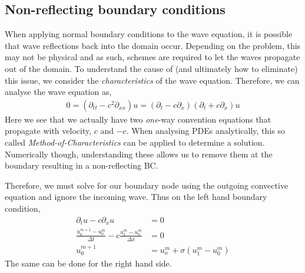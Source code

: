 \documentclass[11pt,a4paper]{report}
\theoremstyle{definition}
\begin{document}
\subsection{Non-reflecting boundary conditions}
When applying normal boundary conditions to the wave equation, it is possible that wave reflections back into the domain occur. Depending on the problem, this may not be physical and as such, schemes are required to let the waves propagate out of the domain. To understand the cause of (and ultimately how to eliminate) this issue, we consider the \textit{characteristics} of the wave equation. Therefore, we can analyse the wave equation as,
\begin{align*}
0 = \left(\partial_{tt} - c^2 \partial_{xx}\right) u = (\partial_t - c \partial_x)(\partial_t + c \partial_x)u
\end{align*}
Here we see that we actually have two \textit{one}-way convention equations that propagate with velocity, $c$ and $-c$. When analysing PDEs analytically, this so called \textit{Method-of-Characteristics} can be applied to determine a solution. Numerically though, understanding these allows us to remove them at the boundary resulting in a non-reflecting BC.

Therefore, we must solve for our boundary node using the outgoing convective equation and ignore the incoming wave. Thus on the left hand boundary condition,
\begin{align*}
	\partial_t u - c \partial_x u &= 0 \\
	\frac{u_0^{m+1} - u_0^m}{\Delta t} - c 	\frac{u_1^{m} - u_0^m}{\Delta x} &= 0 \\
	u_0^{m+1} &= u_o^m + \sigma (u_1^m - u_0^m)
\end{align*}
The same can be done for the right hand side.
\end{document}
